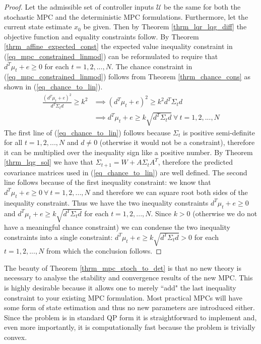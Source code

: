 \begin{proof}
Let the admissible set of controller inputs $\mathcal{U}$ be the same for both the stochastic MPC and the deterministic MPC formulations. Furthermore, let the current state estimate $x_0$ be given. Then by Theorem \ref{thrm_lqr_lqg_diff} the objective function and equality constraints follow. By Theorem \ref{thrm_affine_expected_const} the expected value inequality constraint in (\ref{eq_mpc_constrained_linmod}) can be reformulated to require that $d^T\mu_t + e \geq 0$ for each $t=1, 2,..., N$. The chance constraint in (\ref{eq_mpc_constrained_linmod}) follows from Theorem \ref{thrm_chance_cons} as shown in (\ref{eq_chance_to_lin}).
\begin{equation}
\begin{aligned}
\frac{(d^T\mu_t+e)^2}{d^T \Sigma_t d} \geq k^2 &\implies (d^T\mu_t+e)^2 \geq k^2 {d^T \Sigma_t d} \\
&\implies d^T\mu_t+e \geq k \sqrt{d^T \Sigma_t d}~\forall~t=1, 2,..., N
\end{aligned}
\label{eq_chance_to_lin}
\end{equation}
The first line of (\ref{eq_chance_to_lin}) follows because $\Sigma_t$ is positive semi-definite for all $t=1, 2,..., N$ and $d \neq 0$ (otherwise it would not be a constraint), therefore it can be multiplied over the inequality sign like a positive number. By Theorem \ref{thrm_lqg_sol} we have that $\Sigma_{t+1} = W + A\Sigma_tA^T$, therefore the predicted covariance matrices used in (\ref{eq_chance_to_lin}) are well defined. The second line follows because of the first inequality constraint: we know that $d^T\mu_t+e \geq 0 ~\forall~t=1,2,..., N$ and therefore we can square root both sides of the inequality constraint. Thus we have the two inequality constraints $d^T\mu_t+e \geq 0$ and $d^T\mu_t+e \geq k \sqrt{d^T \Sigma_t d}$ for each $t=1,2,...,N$. Since $k > 0$ (otherwise we do not have a meaningful chance constraint) we can condense the two inequality constraints into a single constraint: $d^T\mu_t+e \geq k \sqrt{d^T \Sigma_t d} > 0$ for each $t=1,2,...,N$ from which the conclusion follows.  
\end{proof}
The beauty of Theorem \ref{thrm_mpc_stoch_to_det} is that no new theory is necessary to analyse the stability and convergence results of the new MPC. This is highly desirable because it allows one to merely ``add" the last inequality constraint to your existing MPC formulation. Most practical MPCs will have some form of state estimation and thus no new parameters are introduced either. Since the problem is in standard QP form it is straightforward to implement and, even more importantly, it is computationally fast because the problem is trivially convex.

